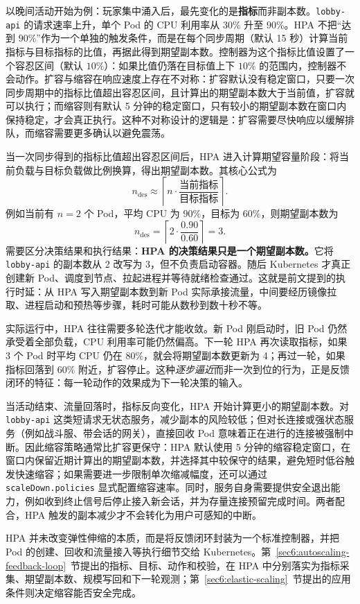 以晚间活动开始为例：玩家集中涌入后，最先变化的是\textbf{指标}而非副本数。\texttt{lobby-api} 的请求速率上升，单个 Pod 的 CPU 利用率从 $30\%$ 升至 $90\%$。HPA 不把“达到 $90\%$”作为一个单独的触发条件，而是在每个同步周期（默认 15 秒）计算当前指标与目标指标的比值，再据此得到期望副本数。控制器为这个指标比值设置了一个容忍区间（默认 $10\%$）：如果比值仍落在目标值上下 $10\%$ 的范围内，控制器不会动作。扩容与缩容在响应速度上存在不对称：扩容默认没有稳定窗口，只要一次同步周期中的指标比值超出容忍区间，且计算出的期望副本数大于当前值，扩容就可以执行；而缩容则有默认 5 分钟的稳定窗口，只有较小的期望副本数在窗口内保持稳定，才会真正执行。这种不对称设计的逻辑是：扩容需要尽快响应以缓解排队，而缩容需要更多确认以避免震荡。

当一次同步得到的指标比值超出容忍区间后，HPA 进入计算期望容量阶段：将当前负载与目标负载做比例换算，得出期望副本数。其核心公式为
\[
n_{\mathrm{des}} \approx \left\lceil n \cdot \frac{\text{当前指标}}{\text{目标指标}}\right\rceil.
\]
例如当前有 $n=2$ 个 Pod，平均 CPU 为 $90\%$，目标为 $60\%$，则期望副本数为
\[
n_{\mathrm{des}}=\left\lceil 2 \cdot \frac{0.90}{0.60}\right\rceil = 3.
\]
需要区分决策结果和执行结果：\textbf{HPA 的决策结果只是一个期望副本数。}它将 \texttt{lobby-api} 的副本数从 2 改写为 3，但不负责启动容器。随后 Kubernetes 才真正创建新 Pod、调度到节点、拉起进程并等待就绪检查通过。这就是前文提到的执行时延：从 HPA 写入期望副本数到新 Pod 实际承接流量，中间要经历镜像拉取、进程启动和预热等步骤，耗时可能从数秒到数十秒不等。

实际运行中，HPA 往往需要多轮迭代才能收敛。新 Pod 刚启动时，旧 Pod 仍然承受着全部负载，CPU 利用率可能仍然偏高。下一轮 HPA 再次读取指标，如果 3 个 Pod 时平均 CPU 仍在 $80\%$，就会将期望副本数更新为 4；再过一轮，如果指标回落到 $60\%$ 附近，扩容停止。这种\emph{逐步逼近}而非一次到位的行为，正是反馈闭环的特征：每一轮动作的效果成为下一轮决策的输入。

当活动结束、流量回落时，指标反向变化，HPA 开始计算更小的期望副本数。对 \texttt{lobby-api} 这类短请求无状态服务，减少副本的风险较低；但对长连接或强状态服务（例如战斗服、带会话的网关），直接回收 Pod 意味着正在进行的连接被强制中断。因此缩容策略通常比扩容更保守：HPA 默认使用 5 分钟的缩容稳定窗口，在窗口内保留近期计算出的期望副本数，并选择其中较保守的结果，避免短时低谷触发快速缩容；如果需要进一步限制单次缩减幅度，还可以通过 \texttt{scaleDown.policies} 显式配置缩容速率。同时，服务自身需要提供安全退出能力，例如收到终止信号后停止接入新会话，并为存量连接预留完成时间。两者配合，HPA 触发的副本减少才不会转化为用户可感知的中断。

HPA 并未改变弹性伸缩的本质，而是将反馈闭环封装为一个标准控制器，并把 Pod 的创建、回收和流量接入等执行细节交给 Kubernetes。第~\ref{sec6:autoscaling-feedback-loop}~节提出的指标、目标、动作和校验，在 HPA 中分别落实为指标采集、期望副本数、规模写回和下一轮观测；第~\ref{sec6:elastic-scaling}~节提出的应用条件则决定缩容能否安全完成。

